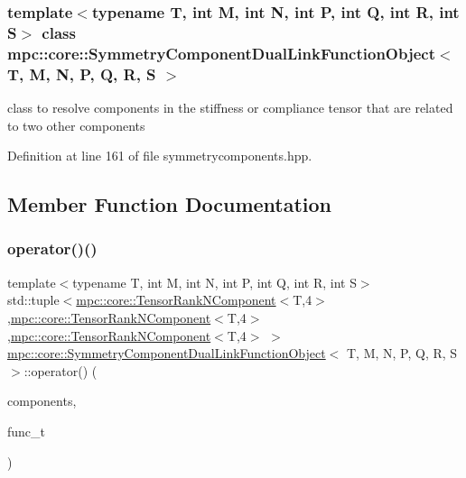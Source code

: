 \subsubsection*{template$<$typename T, int M, int N, int P, int Q, int R, int S$>$\newline
class mpc\+::core\+::\+Symmetry\+Component\+Dual\+Link\+Function\+Object$<$ T, M, N, P, Q, R, S $>$}

class to resolve components in the stiffness or compliance tensor that are related to two other components 

Definition at line 161 of file symmetrycomponents.\+hpp.



\subsection{Member Function Documentation}
\mbox{\label{structmpc_1_1core_1_1_symmetry_component_dual_link_function_object_a7dfea4f0c6734f22299495c5d0e92ef7}} 
\subsubsection{\texorpdfstring{operator()()}{operator()()}}
{\footnotesize\ttfamily template$<$typename T, int M, int N, int P, int Q, int R, int S$>$ \\
std\+::tuple$<$\mbox{\hyperlink{classmpc_1_1core_1_1_tensor_rank_n_component}{mpc\+::core\+::\+Tensor\+Rank\+N\+Component}}$<$T,4$>$,\mbox{\hyperlink{classmpc_1_1core_1_1_tensor_rank_n_component}{mpc\+::core\+::\+Tensor\+Rank\+N\+Component}}$<$T,4$>$,\mbox{\hyperlink{classmpc_1_1core_1_1_tensor_rank_n_component}{mpc\+::core\+::\+Tensor\+Rank\+N\+Component}}$<$T,4$>$ $>$ \mbox{\hyperlink{structmpc_1_1core_1_1_symmetry_component_dual_link_function_object}{mpc\+::core\+::\+Symmetry\+Component\+Dual\+Link\+Function\+Object}}$<$ T, M, N, P, Q, R, S $>$\+::operator() (\begin{DoxyParamCaption}\item[{std\+::set$<$ \mbox{\hyperlink{classmpc_1_1core_1_1_tensor_rank_n_component}{mpc\+::core\+::\+Tensor\+Rank\+N\+Component}}$<$ T, 4 $>$ $>$ \&}]{components,  }\item[{std\+::function$<$ void(\mbox{\hyperlink{namespacempc_1_1core_ac3a232afc7c680d580628e834030482f}{mpc\+::core\+::\+Tensor\+Rank4\+Component}}$<$ T $>$ \&, \mbox{\hyperlink{namespacempc_1_1core_ac3a232afc7c680d580628e834030482f}{mpc\+::core\+::\+Tensor\+Rank4\+Component}}$<$ T $>$ \&, \mbox{\hyperlink{namespacempc_1_1core_ac3a232afc7c680d580628e834030482f}{mpc\+::core\+::\+Tensor\+Rank4\+Component}}$<$ T $>$ \&)$>$}]{func\+\_\+t }\end{DoxyParamCaption})\hspace{0.3cm}{\ttfamily [inline]}}



